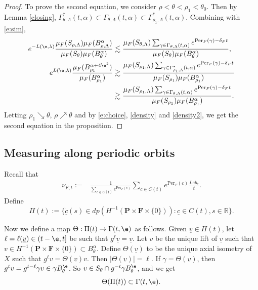\documentclass[11pt]{amsart}
\theoremstyle{definition}
\def\RR{{\mathbb R}}
\def\lv{{\underline v}}
\def\lc{{\underline c}}
\def\a{\alpha}
\def\c{\gamma}   \def\C{\Gamma}
\def\d{\delta}   %
\def\l{\lambda}   \def\L{\Lambda}
\def\lv{{\underline v}}
\def\bP{\textbf{P}}
\def\bF{\textbf{F}}
\newcommand{\Per}{\mathrm{Per}}
\begin{document}
\begin{proof}
To prove the second equation, we consider $\rho<\theta<\rho_1< \theta_0$. Then by Lemma \ref{closing}, 
$\C^*_{\theta,\L}(t,\a)\subset \C_{\theta,\L}(t,\a) \subset \C^*_{\rho_1,\L}(t,\a).$ Combining with \eqref{e:sim},
\begin{equation*}
\begin{aligned}
e^{-L(\e,\l)}\frac{\mu_F(S_{\rho,\L})\mu_F(B_{\rho,\L}^\a)}{\mu_F(S_\theta)\mu_F(B_\theta^\a)}& \lesssim \frac{\mu_F(S_{\theta,\L})\sum_{\c\in \C_{\theta,\L}(t,\a)}e^{\Per_F(\c)-\d_Ft}}{\mu_F(S_\theta)\mu_F(B_\theta^\a)},\\
 e^{L(\e,\l)}\frac{\mu_F(B_{\rho_1}^{\a+4\e^2})}{\mu_F(B_{\rho_1}^\a)}&\gtrsim \frac{\mu_F(S_{\rho_1,\L})\sum_{\c\in \C^*_{{\rho_1},\L}(t,\a)}e^{\Per_F(\c)-\d_Ft}}{\mu_F(S_{\rho_1})\mu_F(B_{\rho_1}^\a)}\\
 &\gtrsim \frac{\mu_F(S_{\rho_1,\L})\sum_{\c\in \C_{\theta,\L}(t,\a)}e^{\Per_F(\c)-\d_Ft}}{\mu_F(S_{\rho_1})\mu_F(B_{\rho_1}^\a)}.
\end{aligned}
\end{equation*}
Letting $\rho_1\searrow \theta$, $\rho\nearrow \theta$ and by \eqref{e:choice}, \eqref{density} and \eqref{density2}, we get the second equation in the proposition.
\end{proof}




\subsection{Measuring along periodic orbits}
Recall that
\begin{equation}\label{e:ct}
\begin{aligned}
\nu_{F,t}:=&\frac{1}{\sum_{c\in C(t)}e^{\Per_F(c)}}\sum_{c\in C(t)}e^{\Per_F(c)}\frac{Leb_c}{t}.
\end{aligned}
\end{equation}
Define
$$\Pi(t):=\{\dot{\lc}(s)\in dp( H^{-1}(\bP\times \bF\times \{0\})): \lc\in C(t), s\in \RR\}.$$

Now we define a map $\Theta: \Pi(t)\to \C(t,\e)$ as follows. Given $\lv\in \Pi(t)$, let $\ell=\ell(\lv)\in (t-\e,t]$ be such that $g^\ell\lv=\lv$. Let $v$ be the unique lift of $\lv$ such that $v\in H^{-1}(\bP\times \bF\times \{0\})\subset B_\theta^\a$.
Define $\Theta(\lv)$ to be the unique axial isometry of $X$ such that $g^\ell v=\Theta(\lv) v$. Then $|\Theta(\lv)|=\ell$. If $\c=\Theta(\lv)$, then $g^tv=g^{t-\ell}\c v\in \c B_\theta^\e$. So $v\in S_\theta\cap g^{-t}\c B_\theta^\e$, and we get
\begin{equation*}
\begin{aligned}
\Theta(\Pi(t))\subset \C(t,\e).
\end{aligned}
\end{equation*}
\end{document}
